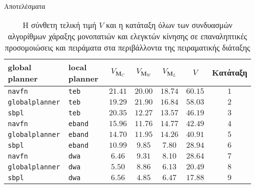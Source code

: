 \begin{frame}{Αποτελέσματα}

  \footnotesize
\begin{table}\centering
\begin{tabular}{llccccc}
  global planner          & local planner   & $V_{\bm{M}_C}$ & $V_{\bm{M}_W}$ & $V_{\bm{M}_L}$ & $V$      & Κατάταξη \\ \toprule
  \texttt{navfn}          & \texttt{teb}    & $21.41$        & $20.00$        & $18.74$        & $60.15$  & $1$      \\
  \texttt{globalplanner}  & \texttt{teb}    & $19.29$        & $21.90$        & $16.84$        & $58.03$  & $2$      \\
  \texttt{sbpl}           & \texttt{teb}    & $20.35$        & $12.27$        & $13.57$        & $46.19$  & $3$      \\
  \texttt{navfn}          & \texttt{eband}  & $15.96$        & $11.76$        & $14.77$        & $42.49$  & $4$      \\
  \texttt{globalplanner}  & \texttt{eband}  & $14.70$        & $11.95$        & $14.26$        & $40.91$  & $5$      \\
  \texttt{sbpl}           & \texttt{eband}  & $10.99$        & $9.85$         & $7.80$         & $28.94$  & $6$      \\
  \texttt{navfn}          & \texttt{dwa}    & $6.46$         & $9.31$         & $8.10$         & $28.64$  & $7$      \\
  \texttt{globalplanner}  & \texttt{dwa}    & $5.50$         & $8.86$         & $6.13$         & $20.49$  & $8$      \\
  \texttt{sbpl}           & \texttt{dwa}    & $6.56$         & $4.85$         & $6.47$         & $17.88$  & $9$      \\ \bottomrule
\end{tabular}
\caption{ Η σύνθετη τελική τιμή $V$ και η κατάταξη όλων των συνδυασμών
         αλγορίθμων χάραξης μονοπατιών και ελεγκτών κίνησης σε
         επαναληπτικές προσομοιώσεις και πειράματα στα περιβάλλοντα
         της πειραματικής διάταξης}
\end{table}


\end{frame}
